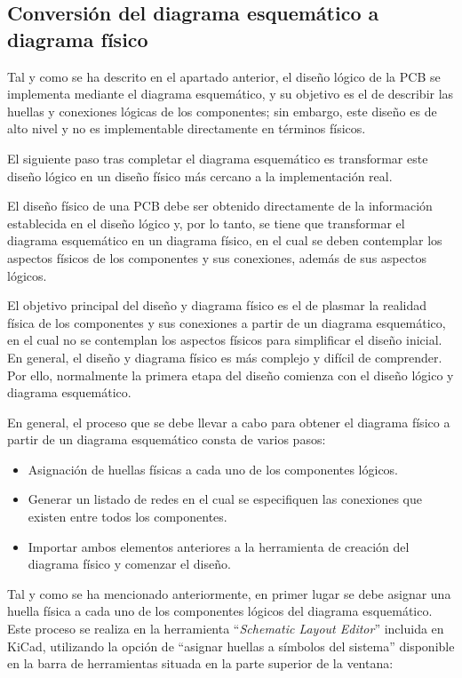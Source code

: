 \subsection{Conversión del diagrama esquemático a diagrama físico}

Tal y como se ha descrito en el apartado anterior, el diseño lógico de la \ac{PCB} se implementa mediante el diagrama esquemático, y su objetivo es el de describir las huellas y conexiones lógicas de los componentes; sin embargo, este diseño es de alto nivel y no es implementable directamente en términos físicos. 

El siguiente paso tras completar el diagrama esquemático es transformar este diseño lógico en un diseño físico más cercano a la implementación real. 

El diseño físico de una \ac{PCB} debe ser obtenido directamente de la información establecida en el diseño lógico y, por lo tanto, se tiene que transformar el diagrama esquemático en un diagrama físico, en el cual se deben contemplar los aspectos físicos de los componentes y sus conexiones, además de sus aspectos lógicos.

El objetivo principal del diseño y diagrama físico es el de plasmar la realidad física de los componentes y sus conexiones a partir de un diagrama esquemático, en el cual no se contemplan los aspectos físicos para simplificar el diseño inicial. En general, el diseño y diagrama físico es más complejo y difícil de comprender. Por ello, normalmente la primera etapa del diseño comienza con el diseño lógico y diagrama esquemático.

En general, el proceso que se debe llevar a cabo para obtener el diagrama físico a partir de un diagrama esquemático consta de varios pasos:
\begin{itemize}
    \item Asignación de huellas físicas a cada uno de los componentes lógicos.
    \item Generar un listado de redes en el cual se especifiquen las conexiones que existen entre todos los componentes.
    \item Importar ambos elementos anteriores a la herramienta de creación del diagrama físico y comenzar el diseño.
\end{itemize}

Tal y como se ha mencionado anteriormente, en primer lugar se debe asignar una huella física a cada uno de los componentes lógicos del diagrama esquemático. Este proceso se realiza en la herramienta ``\textit{Schematic Layout Editor}'' incluida en KiCad, utilizando la opción de ``asignar huellas a símbolos del sistema'' disponible en la barra de herramientas situada en la parte superior de la ventana:

